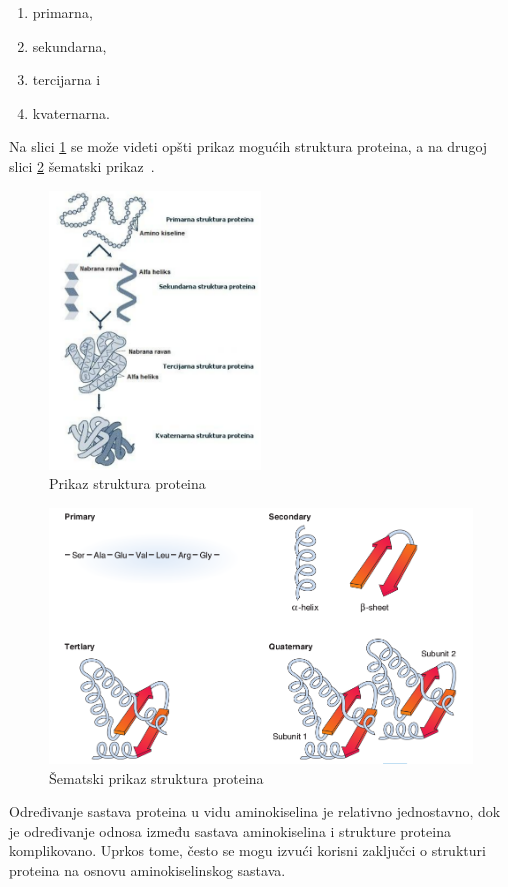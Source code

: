 \begin{enumerate}
\item primarna,
\item sekundarna,
\item tercijarna i
\item kvaternarna.
\end{enumerate}
Na slici \ref{fig:structures} se može videti opšti prikaz mogućih struktura proteina, a na drugoj slici \ref{fig:structures2} šematski prikaz~\cite{spasic}.
\begin{figure}[h]
	\centering
    \includegraphics[width=0.5\textwidth]{Figures/BO/protein_structures.png}
    \caption{Prikaz struktura proteina}
    \label{fig:structures}
\end{figure}
\begin{figure}[h]
	\centering
    \includegraphics[width=1\textwidth]{Figures/BO/structure_schema.png}
    \caption{Šematski prikaz struktura proteina~\cite{bmbg}}
    \label{fig:structures2}
\end{figure}
Određivanje sastava proteina u vidu aminokiselina je relativno jednostavno, dok je određivanje odnosa između sastava aminokiselina i strukture proteina komplikovano. Uprkos tome, često se mogu izvući korisni zaključci o strukturi proteina na osnovu aminokiselinskog sastava.~\cite{Principi}

